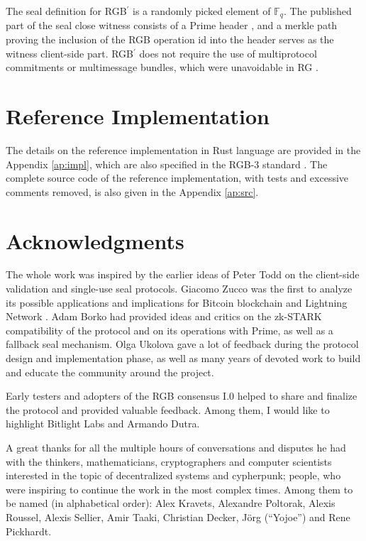 \documentclass[9pt,oneside]{amsart}
\def\bitcoin{%
  \leavevmode
  \vtop{\offinterlineskip %
    \setbox0=\hbox{B}%
    \setbox2=\hbox to\wd0{\hfil\hskip-.03em
    \vrule height .3ex width .15ex\hskip .08em
    \vrule height .3ex width .15ex\hfil}
    \vbox{\copy2\box0}\box2}}
\begin{document}
\begin{multicols}{2}
The seal definition for RGB$^\prime$ is a randomly picked element of $\mathbb{F}_q$.
The published part of the seal close witness consists of a Prime header \cite{Prime},
and a merkle path proving the inclusion of the RGB operation id into the header
serves as the witness client-side part.
RGB$^\prime$ does not require the use of multiprotocol commitments or multimessage bundles,
which were unavoidable in RG\bitcoin.

\section{Reference Implementation}

The details on the reference implementation in Rust language are provided in the Appendix \ref{ap:impl},
which are also specified in the RGB-3 standard \cite{RGB3}.
The complete source code of the reference implementation, with tests and excessive comments removed,
is also given in the Appendix \ref{ap:src}.


\section{Acknowledgments}
The whole work was inspired by the earlier ideas of Peter Todd
on the client-side validation \cite{CSV} and single-use seal \cite{SUS1, SUS2} protocols.
Giacomo Zucco was the first to analyze its possible applications and
implications for Bitcoin blockchain and Lightning Network \cite{Zucco}.
Adam Borko had provided ideas and critics on the zk-STARK compatibility of the protocol and
on its operations with Prime, as well as a fallback seal mechanism.
Olga Ukolova gave a lot of feedback during the protocol design and implementation phase,
as well as many years of devoted work to build and educate the community around the project.

Early testers and adopters of the RGB consensus I.0 helped to share and finalize the protocol
and provided valuable feedback.
Among them, I would like to highlight Bitlight Labs and Armando Dutra.

A great thanks for all the multiple hours of conversations and disputes he had with
the thinkers, mathematicians, cryptographers and computer scientists
interested in the topic of decentralized systems and cypherpunk;
people, who were inspiring to continue the work in the most complex times.
Among them to be named (in alphabetical order):
Alex Kravets, Alexandre Poltorak, Alexis Roussel, Alexis Sellier,
Amir Taaki, Christian Decker, Jörg (``Yojoe'') and Rene Pickhardt.


\end{multicols}
\end{document}
